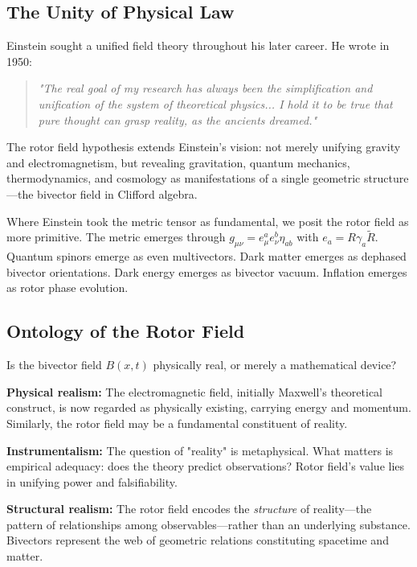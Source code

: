 \documentclass[11pt,a4paper]{article}
\numberwithin{equation}{section}
\theoremstyle{plain}
\theoremstyle{definition}
\theoremstyle{remark}
\newcommand{\rev}[1]{\widetilde{#1}}       %
\begin{document}
\subsection{The Unity of Physical Law}

Einstein sought a unified field theory throughout his later career. He wrote in 1950:

\begin{quote}
\textit{"The real goal of my research has always been the simplification and unification of the system of theoretical physics... I hold it to be true that pure thought can grasp reality, as the ancients dreamed."}
\end{quote}

The rotor field hypothesis extends Einstein's vision: not merely unifying gravity and electromagnetism, but revealing gravitation, quantum mechanics, thermodynamics, and cosmology as manifestations of a single geometric structure—the bivector field in Clifford algebra.

Where Einstein took the metric tensor as fundamental, we posit the rotor field as more primitive. The metric emerges through $g_{\mu\nu} = e^a_\mu e^b_\nu \eta_{ab}$ with $e_a = R\gamma_a\rev{R}$. Quantum spinors emerge as even multivectors. Dark matter emerges as dephased bivector orientations. Dark energy emerges as bivector vacuum. Inflation emerges as rotor phase evolution.

\subsection{Ontology of the Rotor Field}

Is the bivector field $B(x,t)$ physically real, or merely a mathematical device?

\textbf{Physical realism:} The electromagnetic field, initially Maxwell's theoretical construct, is now regarded as physically existing, carrying energy and momentum. Similarly, the rotor field may be a fundamental constituent of reality.

\textbf{Instrumentalism:} The question of "reality" is metaphysical. What matters is empirical adequacy: does the theory predict observations? Rotor field's value lies in unifying power and falsifiability.

\textbf{Structural realism:} The rotor field encodes the \emph{structure} of reality—the pattern of relationships among observables—rather than an underlying substance. Bivectors represent the web of geometric relations constituting spacetime and matter.
\end{document}

